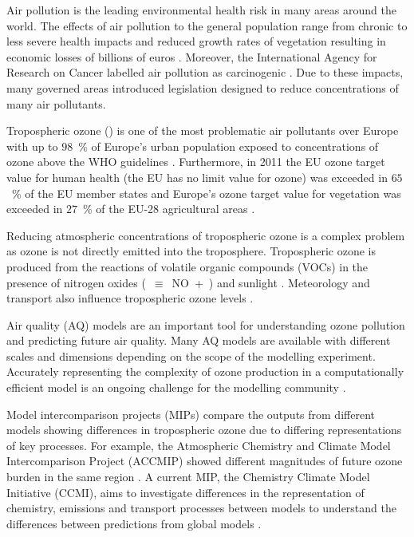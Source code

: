 Air pollution is the leading environmental health risk in many areas around the world.
The effects of air pollution to the general population range from chronic to less severe health impacts and reduced growth rates of vegetation resulting in economic losses of billions of euros \citep{AQEU:2015}.
Moreover, the International Agency for Research on Cancer labelled air pollution as carcinogenic \citep{IARC:2013}.
Due to these impacts, many governed areas introduced legislation designed to reduce concentrations of many air pollutants.

Tropospheric ozone () is one of the most problematic air pollutants over Europe with up to $98$~\% of Europe's urban population exposed to concentrations of ozone above the WHO guidelines \citep{AQEU:2015}.
Furthermore, in 2011 the EU ozone target value for human health (the EU has no limit value for ozone) was exceeded in $65$~\% of the EU member states and Europe's ozone target value for vegetation was exceeded in $27$~\% of the EU-28 agricultural areas \citep{AQEU:2013}.

Reducing atmospheric concentrations of tropospheric ozone is a complex problem as ozone is not directly emitted into the troposphere.
Tropospheric ozone is produced from the reactions of volatile organic compounds (VOCs) in the presence of nitrogen oxides \mbox{(~$\equiv$~NO + )} and sunlight \citep{Atkinson:2000}.
Meteorology and transport also influence tropospheric ozone levels \citep{Jacob:2009}.

Air quality (AQ) models are an important tool for understanding ozone pollution and predicting future air quality.
Many AQ models are available with different scales and dimensions depending on the scope of the modelling experiment.
Accurately representing the complexity of ozone production in a computationally efficient model is an ongoing challenge for the modelling community \citep{Russell:2000}.

Model intercomparison projects (MIPs) compare the outputs from different models showing differences in tropospheric ozone due to differing representations of key processes.
For example, the Atmospheric Chemistry and Climate Model Intercomparison Project (ACCMIP) showed different magnitudes of future ozone burden in the same region \citep{Young:2013}.
A current MIP, the Chemistry Climate Model Initiative (CCMI), aims to investigate differences in the representation of chemistry, emissions and transport processes between models to understand the differences between predictions from global models \citep{Eyring:2013}.

